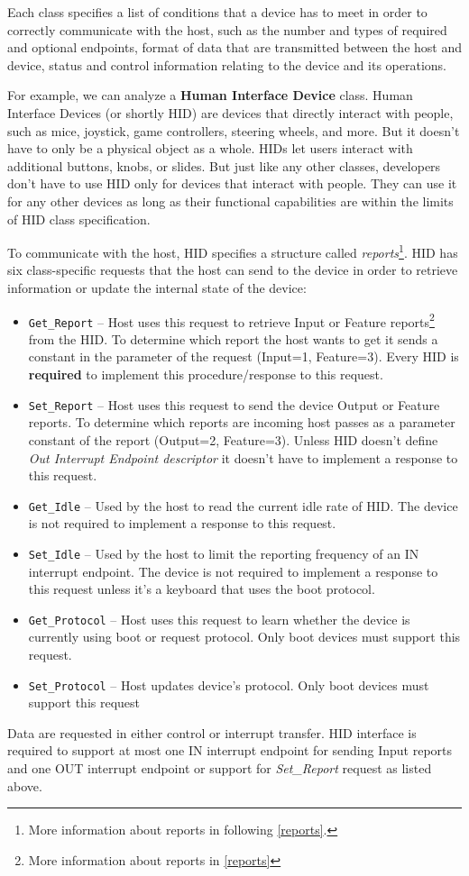 Each class specifies a list of conditions that a device has to meet in order to correctly communicate with the host, such as the number and types of required and optional endpoints, format of data that are transmitted between the host and device, status and control information relating to the device and its operations.

For example, we can analyze a \textbf{Human Interface Device} class. Human Interface Devices (or shortly HID) are devices that directly interact with people, such as mice, joystick, game controllers, steering wheels, and more. But it doesn't have to only be a physical object as a whole. HIDs let users interact with additional buttons, knobs, or slides. But just like any other classes, developers don't have to use HID only for devices that interact with people. They can use it for any other devices as long as their functional capabilities are within the limits of HID class
specification.

To communicate with the host, HID specifies a structure called \emph{reports}\footnote{More information about reports in following \autoref{reports}.}. HID has six class-specific requests that the host can send to the device in order to retrieve information or update the internal state of the device:
\begin{itemize}
    \item \verb|Get_Report| \--- Host uses this request to retrieve Input or Feature reports\footnote{More information about reports in \autoref{reports}} from the HID. To determine which report the host wants to get it sends a constant in the parameter of the request (Input=1, Feature=3). Every HID is \textbf{required} to implement this procedure/response to this request. 
    \item \verb|Set_Report| \--- Host uses this request to send the device Output or Feature reports. To determine which reports are incoming host passes as a parameter constant of the report (Output=2, Feature=3). Unless HID doesn't define \emph{Out Interrupt Endpoint descriptor} it doesn't have to implement a response to this request. 
    \item \verb|Get_Idle| \--- Used by the host to read the current idle rate of HID. The device is not required to implement a response to this request. 
    \item \verb|Set_Idle| \--- Used by the host to limit the reporting frequency of an IN interrupt endpoint. The device is not required to implement a response to this request unless it's a keyboard that uses the boot protocol.
    \item \verb|Get_Protocol| \--- Host uses this request to learn whether the device is currently using boot or request protocol. Only boot devices must support this request.
    \item \verb|Set_Protocol| \--- Host updates device's protocol. Only boot devices must support this request
\end{itemize}
Data are requested in either control or interrupt transfer. HID interface is required to support at most one IN interrupt endpoint for sending Input reports and one OUT interrupt endpoint or support for \emph{Set\_Report} request as listed above.

